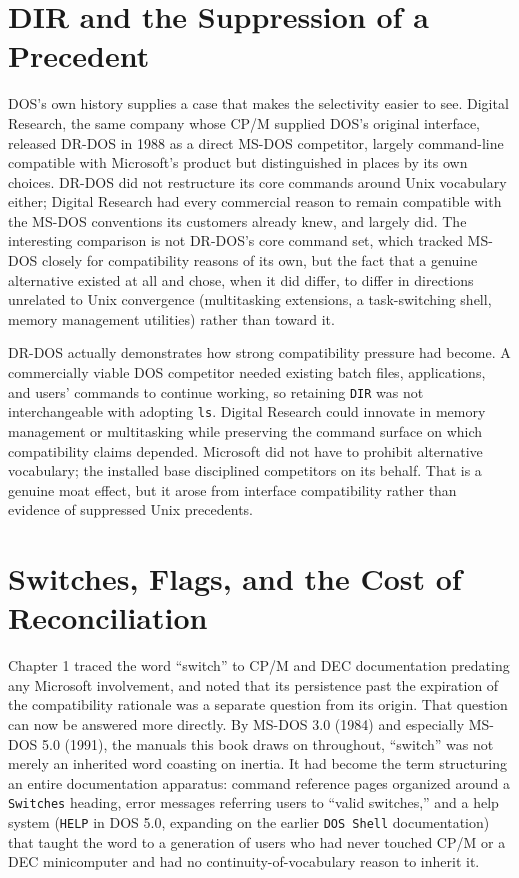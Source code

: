 \documentclass[11pt]{book}
\begin{document}
\section{DIR and the Suppression of a Precedent}

DOS's own history supplies a case that makes the selectivity easier to see. Digital Research, the same company whose CP/M supplied DOS's original interface, released DR-DOS in 1988 as a direct MS-DOS competitor, largely command-line compatible with Microsoft's product but distinguished in places by its own choices. DR-DOS did not restructure its core commands around Unix vocabulary either; Digital Research had every commercial reason to remain compatible with the MS-DOS conventions its customers already knew, and largely did. The interesting comparison is not DR-DOS's core command set, which tracked MS-DOS closely for compatibility reasons of its own, but the fact that a genuine alternative existed at all and chose, when it did differ, to differ in directions unrelated to Unix convergence (multitasking extensions, a task-switching shell, memory management utilities) rather than toward it.

DR-DOS actually demonstrates how strong compatibility pressure had become. A commercially viable DOS competitor needed existing batch files, applications, and users' commands to continue working, so retaining \texttt{DIR} was not interchangeable with adopting \texttt{ls}. Digital Research could innovate in memory management or multitasking while preserving the command surface on which compatibility claims depended. Microsoft did not have to prohibit alternative vocabulary; the installed base disciplined competitors on its behalf. That is a genuine moat effect, but it arose from interface compatibility rather than evidence of suppressed Unix precedents.

\section{Switches, Flags, and the Cost of Reconciliation}

Chapter 1 traced the word ``switch'' to CP/M and DEC documentation predating any Microsoft involvement, and noted that its persistence past the expiration of the compatibility rationale was a separate question from its origin. That question can now be answered more directly. By MS-DOS 3.0 (1984) and especially MS-DOS 5.0 (1991), the manuals this book draws on throughout, ``switch'' was not merely an inherited word coasting on inertia. It had become the term structuring an entire documentation apparatus: command reference pages organized around a \texttt{Switches} heading, error messages referring users to ``valid switches,'' and a help system (\texttt{HELP} in DOS 5.0, expanding on the earlier \texttt{DOS Shell} documentation) that taught the word to a generation of users who had never touched CP/M or a DEC minicomputer and had no continuity-of-vocabulary reason to inherit it.
\end{document}
